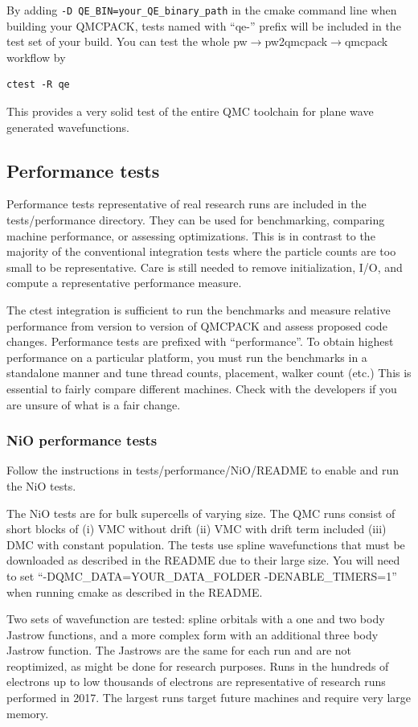 By adding \texttt{-D QE\_BIN=your\_QE\_binary\_path} in the cmake command line when building your QMCPACK,
tests named with ``qe-'' prefix will be included in the test set of your build.
You can test the whole pw$\to$pw2qmcpack$\to$qmcpack workflow by
\begin{verbatim}
ctest -R qe
\end{verbatim}
This provides a very solid test of the entire QMC
toolchain for plane wave generated wavefunctions.

\subsection{Performance tests}
\label{sec:perftests}
Performance tests representative of real research runs are included in the
tests/performance directory. They can be used for benchmarking, comparing machine
performance, or assessing optimizations. This is in
contrast to the majority of the conventional integration tests where the particle
counts are too small to be representative. Care is still needed to
remove initialization, I/O, and compute a representative performance
measure.

The ctest integration is sufficient to run the benchmarks and measure
relative performance from version to version of QMCPACK and assess
proposed code changes. Performance tests are prefixed with
``performance''. To obtain highest performance on a particular
platform, you must run the benchmarks in a standalone manner and tune
thread counts, placement, walker count (etc.) This is essential to
fairly compare different machines. Check with the
developers if you are unsure of what is a fair change.

\subsubsection{NiO performance tests}

Follow the instructions in tests/performance/NiO/README to
enable and run the NiO tests.

The NiO tests are for bulk supercells of varying size. The QMC runs consist of short blocks of (i) VMC
without drift (ii) VMC with drift term included (iii) DMC with
constant population. The tests use spline wavefunctions that must be
downloaded as described in the README due to their large size. You
will need to set ``-DQMC\_DATA=YOUR\_DATA\_FOLDER -DENABLE\_TIMERS=1''
when running cmake as
described in the README.

Two sets of wavefunction are tested: spline orbitals with a one and
two body Jastrow functions, and a more complex form with an additional
three body Jastrow function. The Jastrows are the same for each run
and are not reoptimized, as might be done for research purposes.  Runs
in the hundreds of electrons up to low thousands of electrons are representative of
research runs performed in 2017. The largest runs target
future machines and require very large memory.

